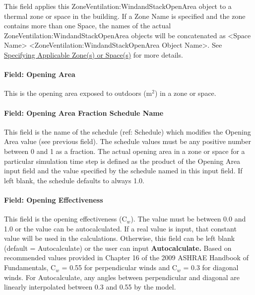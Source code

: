 This field applies this ZoneVentilation:WindandStackOpenArea object to a thermal zone or space in the building. If a Zone Name is specified and the zone contains more than one Space, the names of the actual ZoneVentilation:WindandStackOpenArea objects will be concatenated as \textless{}Space Name\textgreater{} \textless{}ZoneVentilation:WindandStackOpenArea Object Name\textgreater{}. See \hyperref[specifying-applicable-zones-or-spaces]{Specifying Applicable Zone(s) or Space(s)} for more details.

\paragraph{Field: Opening Area}\label{field-opening-area}

This is the opening area exposed to outdoors (m\(^{2}\)) in a zone or space.

\paragraph{Field: Opening Area Fraction Schedule Name}\label{field-opening-area-fraction-schedule-name}

This field is the name of the schedule (ref: Schedule) which modifies the Opening Area value (see previous field). The schedule values must be any positive number between 0 and 1 as a fraction. The actual opening area in a zone or space for a particular simulation time step is defined as the product of the Opening Area input field and the value specified by the schedule named in this input field. If left blank, the schedule defaults to always 1.0.

\paragraph{Field: Opening Effectiveness}\label{field-opening-effectiveness}

This field is the opening effectiveness (C\(_{w}\)). The value must be between 0.0 and 1.0 or the value can be autocalculated. If a real value is input, that constant value will be used in the calculations. Otherwise, this field can be left blank (default = Autocalculate) or the user can input \textbf{Autocalculate.} Based on recommended values provided in Chapter 16 of the 2009 ASHRAE Handbook of Fundamentals, C\(_{w}\) = 0.55 for perpendicular winds and C\(_{w}\) = 0.3 for diagonal winds. For Autocalculate, any angles between perpendicular and diagonal are linearly interpolated between 0.3 and 0.55 by the model.


